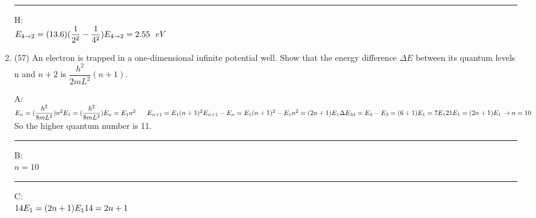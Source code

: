 \documentclass[fleqn]{article}
\begin{document}
\begin{enumerate}
    \textcolor{hwColor}{ 
      \rule{16cm}{0.6pt} 
    } 

    \textcolor{hwColor}{
      H: \\
      $
        E_{4 \rightarrow 2}=(13.6)(\dfrac{1}{2^2}-\dfrac{1}{4^2}) \\
        \\
        E_{4 \rightarrow 2}=2.55 ~~ eV
      $
    }
    
    
    \item (57) An electron is trapped in a one-dimensional infinite potential
    well. Show that the energy difference $\Delta E$ between its quantum levels n and $n+2$ is $\dfrac{h^2}{2mL^2}(n+1)$.

    \textcolor{hwColor}{
      A: \\
      $
        E_n=(\dfrac{h^2}{8mL^2})n^2 \\
        \\
        E_1=(\dfrac{h^2}{8mL^2}) \\
        \\
        E_n=E_1n^2 ~~~~~ E_{n+1}=E_1(n+1)^2 \\
        \\
        \\
        E_{n+1}-E_n=E_1(n+1)^2-E_1n^2=(2n+1)E_1 \\
        \\
        \Delta E_{34}=E_4-E_3=(6+1)E_1=7E_1 \\
        \\
        21E_1=(2n+1)E_1 \rightarrow n=10
      $ So the higher quantum number is 11.
    }

    \textcolor{hwColor}{ 
      \rule{16cm}{0.6pt} 
    } 

    \textcolor{hwColor}{
      B: \\
      $
        n=10
      $ 
    }

    \textcolor{hwColor}{ 
      \rule{16cm}{0.6pt} 
    } 

    \textcolor{hwColor}{
      C: \\
      $
        14E_1=(2n+1)E_1 \\
        \\
        14=2n+1
      $ 
    }


  \end{enumerate}
\end{document}
